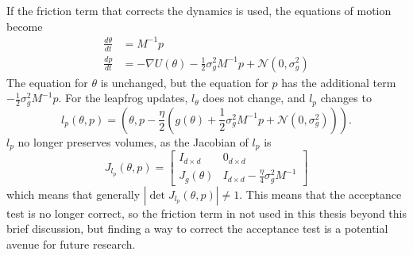 \documentclass[english,twoside,openright]{HYgraduMLDS}
\newcommand{\caln}{{\mathcal{N}}}
\begin{document}
If the friction term that corrects the dynamics is used, the equations of
motion become~\cite{CFG14}
\begin{align*}
  \frac{d\theta}{dt} &= M^{-1}p \\
  \frac{dp}{dt} &= -\nabla U(\theta) - \frac{1}{2}\sigma_{g}^{2}M^{-1}p + \caln(0, \sigma_{g}^{2})
\end{align*}
The equation for \(\theta\) is unchanged, but the equation for \(p\) has the
additional term \(-\frac{1}{2}\sigma_{g}^{2}M^{-1}p\).
For the leapfrog updates, \(l_{\theta}\) does not change, and \(l_{p}\) changes
to
\[
  l_{p}(\theta, p) = \left(\theta, p - \frac{\eta}{2}(g(\theta)
  + \frac{1}{2}\sigma_{g}^{2}M^{-1}p + \caln(0, \sigma_{g}^{2}))\right).
\]
\(l_{p}\) no longer preserves volumes, as the Jacobian of \(l_{p}\) is
\[
  J_{l_{p}}(\theta, p) =
  \begin{bmatrix}
    I_{d\times d} & 0_{d\times d} \\
    J_{g}(\theta) & I_{d\times d} - \frac{\eta}{4}\sigma_{g}^{2}M^{-1}
  \end{bmatrix}
\]
which means that generally \(|\det J_{l_{p}}(\theta, p)| \neq 1\).
This means that the acceptance test is no longer correct, so
the friction term in not used in this thesis beyond this brief discussion,
but finding a way to correct the acceptance test is a potential avenue for
future research.
\end{document}
